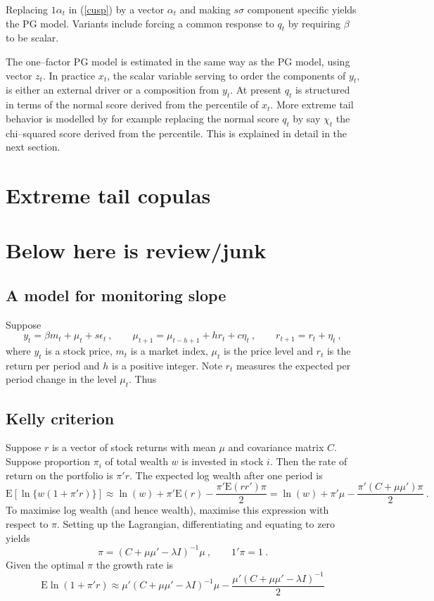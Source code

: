 \documentclass[authoryear]{elsarticle}
\newcommand{\E}{\mathrm{E}}
\newcommand{\eps}{\epsilon}
\newcommand{\eref}[1]{(\ref{#1})}
\newcommand{\cq}{\ , \qquad}
\newcommand{\be}[1]{\begin{equation}\label{#1}}
\newcommand{\ee}{\end{equation}}
\begin{document}
Replacing $1\alpha_t$ in \eref{cusp} by a vector  $\alpha_t$ and making $s\sigma$ component specific  yields the PG model.  Variants include forcing  a common response to $q_t$ by requiring  $\beta$ to be scalar. 

The one--factor PG model is estimated in the same way as the PG model, using vector $z_t$.   In practice $x_t$, the scalar variable serving to order the components of $y_t$, is either an external driver or a composition from $y_t$.   At present $q_t$ is structured in terms of the normal score derived from the percentile of $x_t$.   More extreme tail behavior is modelled by  for example replacing the normal score $q_t$ by say $\chi_t$ the chi--squared score derived from the percentile.   This is explained in detail in the next section.

\section{Extreme tail copulas} 
 

\section{Below here is review/junk}

\subsection{A  model for monitoring slope}
Suppose
\be{slope}
y_t = \beta m_t + \mu_t + s\eps_t\cq \mu_{t+1} = \mu_{t-h+1} + hr_t + c\eta_t \cq r_{t+1}=r_t + \eta_t\ ,
\ee
where $y_t$ is a stock price,  $m_t$ is a market index, $\mu_t$ is the price level and $r_t$ is the return per period and $h$ is a positive  integer.   Note $r_t$ measures  the expected  per period change in the level $\mu_t$.   Thus

\subsection{Kelly criterion}

Suppose $r$ is a vector of stock returns with mean $\mu$ and covariance matrix $C$.    Suppose proportion $\pi_i$ of total wealth $w$  is invested in stock $i$.  Then the rate of return on the portfolio is 
$ \pi'r$.   The expected  log wealth after one period   is 
$$
\E[\ln \{w(1+\pi' r)\}] \approx \ln(w) + \pi'\E(r) -\frac{\pi'\E(rr')\pi}{2} =  \ln(w) + \pi'\mu -\frac{\pi'(C+\mu\mu')\pi}{2}\ .
$$ 
To maximise log wealth (and hence wealth), maximise this expression with respect to $\pi$.   Setting up the Lagrangian, differentiating and equating to zero yields 
$$
\pi = (C+\mu\mu' - \lambda I)^{-1}\mu\cq 1'\pi=1\ .
$$
Given the optimal $\pi$ the growth rate is 
$$
\E\ln(1+\pi'r) \approx \mu'(C+\mu\mu' - \lambda I)^{-1}\mu - \frac{\mu'(C+\mu\mu' - \lambda I)^{-1}}{2}
$$
\end{document}
